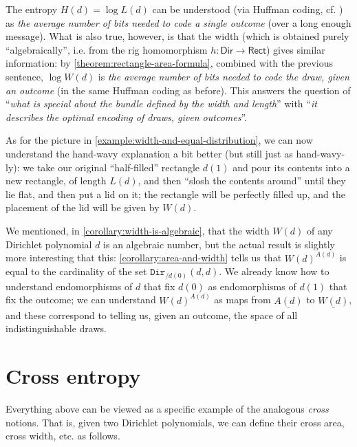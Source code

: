\documentclass[11pt,fleqn]{article}
\newcommand{\cat}[1]{\mathtt{#1}}
\newcommand{\rig}[1]{\mathsf{#1}}
\newcommand{\Dir}{\rig{Dir}}
\newcommand{\cDir}{\cat{Dir}}
\newcommand{\Rect}{\rig{Rect}}
\begin{document}
\begin{remark}
  The entropy $H(d)=\log L(d)$ can be understood (via Huffman coding, cf. \cite{H1952}) as \emph{the average number of bits needed to code a single outcome} (over a long enough message).
  What is also true, however, is that the width (which is obtained purely ``algebraically'', i.e. from the rig homomorphism $h\colon\Dir\to\Rect$) gives similar information: by \cref{theorem:rectangle-area-formula}, combined with the previous sentence, $\log W(d)$ is \emph{the average number of bits needed to code the draw, given an outcome} (in the same Huffman coding as before).
  This answers the question of ``\emph{what is special about the bundle defined by the width and length}'' with ``\emph{it describes the optimal encoding of draws, given outcomes}''.

  As for the picture in \cref{example:width-and-equal-distribution}, we can now understand the hand-wavy explanation a bit better (but still just as hand-wavy-ly):
  we take our original ``half-filled'' rectangle $d(1)$ and pour its contents into a new rectangle, of length $L(d)$, and then ``slosh the contents around'' until they lie flat, and then put a lid on it;
  the rectangle will be perfectly filled up, and the placement of the lid will be given by $W(d)$.
\end{remark}

\begin{remark}
  We mentioned, in \cref{corollary:width-is-algebraic}, that the width $W(d)$ of any Dirichlet polynomial $d$ is an algebraic number, but the actual result is slightly more interesting that this:
  \cref{corollary:area-and-width} tells us that $W(d)^{A(d)}$ is equal to the cardinality of the set $\cDir_{/d(0)}(d,d)$.
  We already know how to understand endomorphisms of $d$ that fix $d(0)$ as endomorphisms of $d(1)$ that fix the outcome;
  we can understand $W(d)^{A(d)}$ as maps from $\underline{A(d)}$ to $\underline{W(d)}$, and these correspond to telling us, given an outcome, the space of all indistinguishable draws.
\end{remark}



\section{Cross entropy}
\label{section:cross-entropy}

Everything above can be viewed as a specific example of the analogous \emph{cross} notions.
That is, given two Dirichlet polynomials, we can define their cross area, cross width, etc. as follows.
\end{document}
